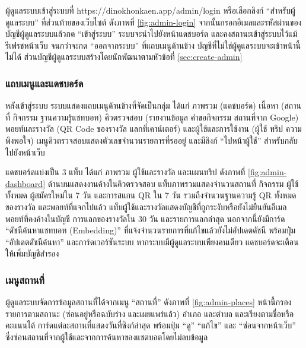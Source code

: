 ผู้ดูแลระบบเข้าสู่ระบบที่ https://dinokhonkaen.app/admin/login หรือเลือกลิงก์ ``สำหรับผู้ดูแลระบบ'' ที่ส่วนท้ายของเว็บไซต์ ดังภาพที่ \ref{fig:admin-login} จากนั้นกรอกอีเมลและรหัสผ่านของบัญชีผู้ดูแลระบบแล้วกด ``เข้าสู่ระบบ'' ระบบจะนำไปยังหน้าแดชบอร์ด และคงสถานะเข้าสู่ระบบไว้แม้รีเฟรชหน้าเว็บ จนกว่าจะกด ``ออกจากระบบ'' ที่แถบเมนูด้านข้าง บัญชีที่ไม่ใช่ผู้ดูแลระบบจะเข้าหน้านี้ไม่ได้ ส่วนบัญชีผู้ดูแลระบบสร้างโดยนักพัฒนาตามหัวข้อที่ \ref{sec:create-admin}


\subsubsection{แถบเมนูและแดชบอร์ด}

หลังเข้าสู่ระบบ ระบบแสดงแถบเมนูด้านข้างที่จัดเป็นกลุ่ม ได้แก่ ภาพรวม (แดชบอร์ด) เนื้อหา (สถานที่ กิจกรรม ฐานความรู้แชทบอท) คิวตรวจสอบ (รายงานข้อมูล คำขอกิจกรรม สถานที่จาก Google) พอยท์และรางวัล (QR Code ของรางวัล แลกที่เคาน์เตอร์) และผู้ใช้และการใช้งาน (ผู้ใช้ ทริป ความพึงพอใจ) เมนูคิวตรวจสอบแสดงตัวเลขจำนวนรายการที่รออยู่ และมีลิงก์ ``ไปหน้าผู้ใช้'' สำหรับกลับไปยังหน้าเว็บ

แดชบอร์ดแบ่งเป็น 3 แท็บ ได้แก่ ภาพรวม ผู้ใช้และรางวัล และแผนทริป ดังภาพที่ \ref{fig:admin-dashboard} ด้านบนแสดงงานค้างในคิวตรวจสอบ แท็บภาพรวมแสดงจำนวนสถานที่ กิจกรรม ผู้ใช้ทั้งหมด ผู้สมัครใหม่ใน 7 วัน และการสแกน QR ใน 7 วัน รวมถึงจำนวนฐานความรู้ QR ทั้งหมด ของรางวัล และพอยท์ที่แจกไปแล้ว แท็บผู้ใช้และรางวัลแสดงบัญชีที่ถูกระงับหรือยังไม่ยืนยันอีเมล พอยท์ที่คงค้างในบัญชี การแลกของรางวัลใน 30 วัน และรายการแลกล่าสุด นอกจากนี้ยังมีการ์ด ``ดัชนีค้นหาแชทบอท (Embedding)'' ที่แจ้งจำนวนรายการที่แก้ไขแล้วยังไม่อัปเดตดัชนี พร้อมปุ่ม ``อัปเดตดัชนีค้นหา'' และการ์ดเวอร์ชันระบบ หากระบบมีผู้ดูแลระบบเพียงคนเดียว แดชบอร์ดจะเตือนให้เพิ่มบัญชีสำรอง


\subsubsection{เมนูสถานที่}

ผู้ดูแลระบบจัดการข้อมูลสถานที่ได้จากเมนู ``สถานที่'' ดังภาพที่ \ref{fig:admin-places} หน้านี้กรองรายการตามสถานะ (ซ่อนอยู่หรือฉบับร่าง และเผยแพร่แล้ว) อำเภอ และตำบล และเรียงตามชื่อหรือคะแนนได้ การ์ดแต่ละสถานที่แสดงวันที่ซิงก์ล่าสุด พร้อมปุ่ม ``ดู'' ``แก้ไข'' และ ``ซ่อนจากหน้าเว็บ'' ซึ่งซ่อนสถานที่จากผู้ใช้และจากการค้นหาของแชตบอตโดยไม่ลบข้อมูล

